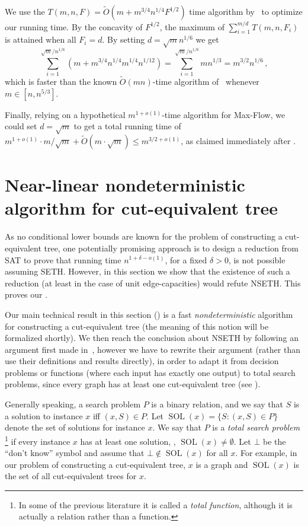 \documentclass{toc}
\theoremstyle{plain}
\newcommand{\ProblemName}[1]{\textsf{#1}}
\newcommand{\MF}{\ProblemName{Max-Flow}\xspace}
\newcommand{\SETH}{SETH\xspace}
\newcommand{\NSETH}{NSETH\xspace}
\DeclareMathOperator{\SOL}{SOL}
\newcommand\tO{\ensuremath{\widetilde O}}  %
\providecommand{\set}[1]{{\{#1\}}}
\begin{document}
We use the $T(m,n,F)=\tO(m+m^{3/4}n^{1/4}F^{1/2})$ time algorithm by~\cite{SidfordT18} to optimize our running time.
By the concavity of $F^{1/2}$, the maximum of $\sum_{i=1}^{m/d}T(m,n,F_i)$ is attained when all $F_i=d$.
By setting $d=\sqrt{m}n^{1/6}$ we get
\[
  \sum_{i=1}^{\sqrt{m}/n^{1/6}} (m+m^{3/4}n^{1/4}m^{1/4}n^{1/12})=
\sum_{i=1}^{\sqrt{m}/n^{1/6}} m n^{1/3}=
m^{3/2}n^{1/6}\,,
\]
which is faster than the known $\tO(mn)$-time algorithm of~\cite{BHKP07} whenever $m\in [n,n^{5/3}]$.

Finally, relying on a hypothetical $m^{1+o(1)}$-time algorithm for \MF,
we could set $d=\sqrt{m}$ to get a total running time of $m^{1+o(1)}\cdot m/\sqrt{m}+\tO(m\cdot \sqrt{m})\leq m^{3/2+o(1)}$, as claimed immediately after .



\section{Near-linear nondeterministic algorithm for cut-equivalent tree}\label{sec:nondet}

As no conditional lower bounds are known
for the problem of constructing a cut-equivalent tree,
one potentially promising approach is to design a reduction from SAT
to prove that running time $n^{1+\delta-o(1)}$, for a fixed $\delta>0$,
is not possible assuming \SETH.
However, in this section we show that the existence of such a reduction (at least in the case of unit edge-capacities) would refute \NSETH.
This proves our .


Our main technical result in this section ()
is a fast \emph{nondeterministic} algorithm
for constructing a cut-equivalent tree (the meaning of this notion will be formalized shortly).
We then reach the conclusion about \NSETH
by following an argument first made in~\cite{carmosino2016nondeterministic},
however we have to rewrite their argument
(rather than use their definitions and results directly),
in order to adapt it from decision problems or functions (where each input has exactly one output) to total search problems,
since every graph has at least one cut-equivalent tree (see ).

Generally speaking, a search problem $P$ is a binary relation,
and we say that $S$ is a solution to instance $x$ iff $(x,S)\in P$.
Let $\SOL(x)=\set{S: (x,S)\in P}$ denote the set of solutions for instance $x$.
We say that $P$ is a \emph{total search problem}%
\footnote{In some of the previous literature it is called a
\textit{total function}, although it is actually a relation rather than a function.}
if every instance $x$ has at least one solution, \ie, $\SOL(x)\neq \emptyset$.
Let $\bot$ be the ``don't know'' symbol and assume that $\bot \notin \SOL(x)$ for all $x$.
For example, in our problem of constructing a cut-equivalent tree,
$x$ is a graph and $\SOL(x)$ is the set of all cut-equivalent trees for $x$.
\end{document}
